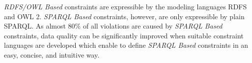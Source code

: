 \documentclass[conference]{IEEEtran}
\begin{document}
\emph{RDFS/OWL Based} constraints are expressible by the modeling languages RDFS and OWL 2. \emph{SPARQL Based} constraints, however, are only expressible by plain SPARQL. As almost 80\% of all violations are caused by \emph{SPARQL Based} constraints, data quality can be significantly improved when suitable constraint languages are developed which enable to define \emph{SPARQL Based} constraints in an easy, concise, and intuitive way.

%
\end{document}
